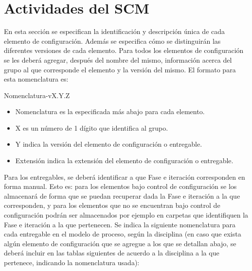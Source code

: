 
\chapter{Actividades del SCM}
\label{intro}
En esta sección se especifican la identificación y descripción única de cada elemento de configuración.
Además se especifica cómo se distinguirán las diferentes versiones de cada elemento.
Para todos los elementos de configuración se les deberá agregar, después del nombre del mismo, información acerca del grupo al que corresponde el elemento y la versión del mismo.
El formato para esta nomenclatura es:


Nomenclatura-vX.Y.Z

\begin{itemize}
\item Nomenclatura es la especificada más abajo para cada elemento.
\item X es un número de 1 dígito que identifica al grupo.
\item Y indica la versión del elemento de configuración o entregable.
\item Extensión indica la extensión del elemento de configuración o entregable.
\end{itemize}


Para los entregables, se deberá identificar a que Fase e iteración corresponden en forma manual. Esto es: para los elementos bajo control de configuración se los almacenará de forma que se puedan recuperar dada la Fase e iteración a la que corresponden, y para los elementos que no se encuentran bajo control de configuración podrán ser almacenados por ejemplo en carpetas que identifiquen la Fase e iteración a la que pertenecen.
Se indica la siguiente nomenclatura para cada entregable en el modelo de proceso, según la disciplina (en caso que exista algún elemento de configuración que se agregue a los que se detallan abajo, se deberá incluir en las tablas siguientes de acuerdo a la disciplina a la que pertenece, indicando la nomenclatura usada):



\cleardoublepage